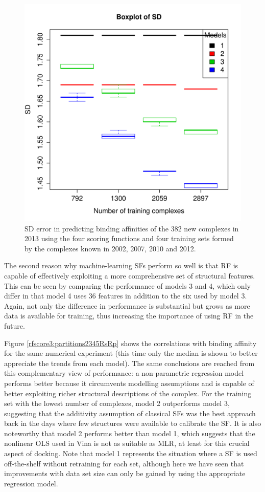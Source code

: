 \begin{figure}
\centering
\includegraphics[width=\linewidth]{../rfscore3/set-2-tst-sdev-boxplot.pdf}
\caption{SD error in predicting binding affinities of the 382 new complexes in 2013 using the four scoring functions and four training sets formed by the complexes known in 2002, 2007, 2010 and 2012.}
\label{rfscore3:partitions2345SD}
\end{figure}

The second reason why machine-learning SFs perform so well is that RF is capable of effectively exploiting a more comprehensive set of structural features. This can be seen by comparing the performance of models 3 and 4, which only differ in that model 4 uses 36 features in addition to the six used by model 3. Again, not only the difference in performance is substantial but grows as more data is available for training, thus increasing the importance of using RF in the future.

Figure \ref{rfscore3:partitions2345RsRp} shows the correlations with binding affinity for the same numerical experiment (this time only the median is shown to better appreciate the trends from each model). The same conclusions are reached from this complementary view of performance: a non-parametric regression model performs better because it circumvents modelling assumptions and is capable of better exploiting richer structural descriptions of the complex. For the training set with the lowest number of complexes, model 2 outperforms model 3, suggesting that the additivity assumption of classical SFs was the best approach back in the days where few structures were available to calibrate the SF. It is also noteworthy that model 2 performs better than model 1, which suggests that the nonlinear OLS used in Vina is not as suitable as MLR, at least for this crucial aspect of docking. Note that model 1 represents the situation where a SF is used off-the-shelf without retraining for each set, although here we have seen that improvements with data set size can only be gained by using the appropriate regression model.

